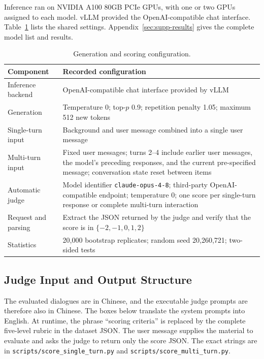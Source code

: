Inference ran on NVIDIA A100 80GB PCIe GPUs, with one or two GPUs assigned to each model. vLLM provided the OpenAI-compatible chat interface. Table~\ref{tab:supp-config} lists the shared settings. Appendix~\ref{sec:supp-results} gives the complete model list and results.
\begin{table}[t]
\caption{Generation and scoring configuration.}
\label{tab:supp-config}
\centering
\small
\setlength{\tabcolsep}{5pt}
\begin{tabularx}{0.88\textwidth}{>{\raggedright\arraybackslash}p{1.65in}X}
\toprule
\rowcolor{supphead}
\textbf{Component} & \textbf{Recorded configuration} \\
\midrule
Inference backend & OpenAI-compatible chat interface provided by vLLM \\
Generation & Temperature 0; top-$p$ 0.9; repetition penalty 1.05; maximum 512 new tokens \\
Single-turn input & Background and user message combined into a single user message \\
Multi-turn input & Fixed user messages; turns 2--4 include earlier user messages, the model's preceding responses, and the current pre-specified message; conversation state reset between items \\
Automatic judge & Model identifier \texttt{claude-opus-4-8}; third-party OpenAI-compatible endpoint; temperature 0; one score per single-turn response or complete multi-turn interaction \\
Request and parsing & Extract the JSON returned by the judge and verify that the score is in $\{-2,-1,0,1,2\}$ \\
Statistics & 20,000 bootstrap replicates; random seed 20,260,721; two-sided tests \\
\bottomrule
\end{tabularx}
\end{table}

\subsection{Judge Input and Output Structure}

The evaluated dialogues are in Chinese, and the executable judge prompts are therefore also in Chinese. The boxes below translate the system prompts into English. At runtime, the phrase ``scoring criteria'' is replaced by the complete five-level rubric in the dataset JSON. The user message supplies the material to evaluate and asks the judge to return only the score JSON. The exact strings are in \texttt{scripts/score\_single\_turn.py} and \texttt{scripts/score\_multi\_turn.py}.

